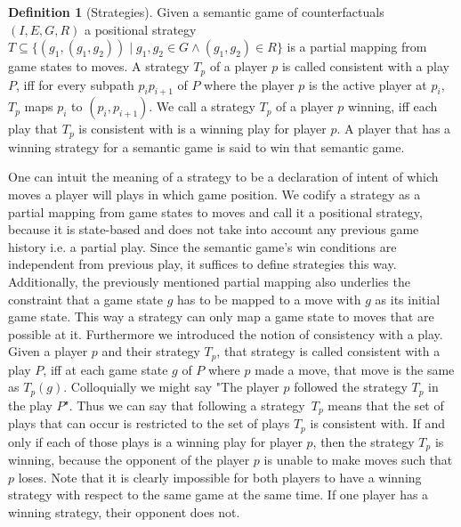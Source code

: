 \documentclass[a4paper,american,10pt]{paper}
\theoremstyle{definition}\newtheorem{definition}{Definition}
\begin{document}
\begin{definition}[Strategies]
Given a semantic game of counterfactuals $(I, E, G, R)$ a positional strategy $T\subseteq\{(g_1,(g_1,g_2))\mid g_1,g_2\in G\wedge (g_1,g_2)\in R\}$ is a partial mapping from game states to moves. A strategy $T_p$ of a player $p$ is called consistent with a play $P$, iff for every subpath $p_ip_{i+1}$ of $P$ where the player $p$ is the active player at $p_i$, $T_p$ maps $p_i$ to $(p_i,p_{i+1})$. We call a strategy $T_p$ of a player $p$ winning, iff each play that $T_p$ is consistent with is a winning play for player $p$. A player that has a winning strategy for a semantic game is said to win that semantic game.
\end{definition}
One can intuit the meaning of a strategy to be a declaration of intent of which moves a player will plays in which game position. We codify a strategy as a partial mapping from game states to moves and call it a positional strategy, because it is state-based and does not take into account any previous game history i.e. a partial play. Since the semantic game's win conditions are independent from previous play, it suffices to define strategies this way. Additionally, the previously mentioned partial mapping also underlies the constraint that a game state $g$ has to be mapped to a move with $g$ as its initial game state. This way a strategy can only map a game state to moves that are possible at it. Furthermore we introduced the notion of consistency with a play. Given a player $p$ and their strategy $T_p$, that strategy is called consistent with a play $P$, iff at each game state $g$ of $P$ where $p$ made a move, that move is the same as $T_p(g)$. Colloquially we might say "The player $p$ followed the strategy $T_p$ in the play $P$". Thus we can say that following a strategy~$T_p$ means that the set of plays that can occur is restricted to the set of plays $T_p$ is consistent with. If and only if each of those plays is a winning play for player $p$, then the strategy $T_p$ is winning, because the opponent of the player $p$ is unable to make moves such that $p$ loses. Note that it is clearly impossible for both players to have a winning strategy with respect to the same game at the same time. If one player has a winning strategy, their opponent does not.
\end{document}
